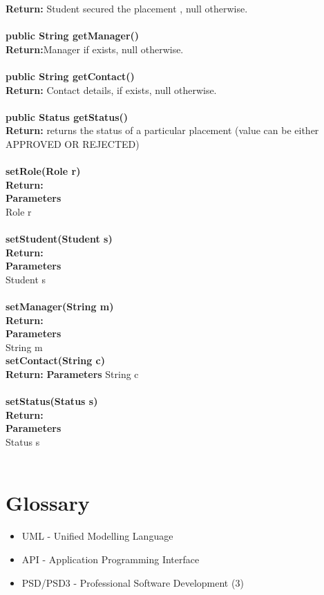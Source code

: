 \documentclass{l3deliverable}
\begin{document}
\textbf{Return: }Student secured the placement , null otherwise.\\
\\
\textbf{public String getManager()}\\
\textbf{Return:}Manager if exists, null otherwise.\\
\\
\textbf{public String getContact()}\\
\textbf{Return: }Contact details, if exists, null otherwise.\\
\\
\textbf{public Status getStatus()}\\
\textbf{Return: }returns the status of a particular placement (value can be either APPROVED OR REJECTED)\\
\\
\textbf{setRole(Role r)}\\
\textbf{Return:}\\
\textbf{Parameters}\\
Role r\\
\\
\textbf{setStudent(Student s)}\\
\textbf{Return:}\\
\textbf{Parameters}\\
Student s\\
\\
\textbf{setManager(String m)}\\
\textbf{Return:}\\
\textbf{Parameters}\\
String m
\\
\textbf{setContact(String c)}\\
\textbf{Return:}
\textbf{Parameters}
String c\\
\\
\textbf{setStatus(Status s)}\\
\textbf{Return:}\\
\textbf{Parameters}\\
Status s\\
\\

\appendix

\section{Glossary}
\begin{itemize}
\item{UML - Unified Modelling Language}
\item{API - Application Programming Interface}
\item{PSD/PSD3 - Professional Software Development (3)}
\end{itemize}
\end{document}

